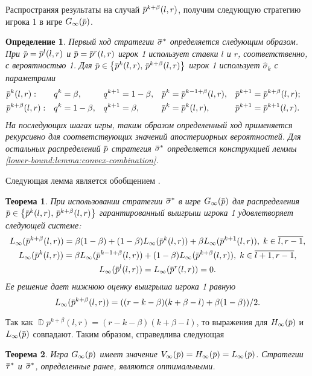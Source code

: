 \documentclass[12pt, draft]{extarticle}
\newtheorem{definition}{Определение}
\newtheorem{theorem}{Теорема}
\newcommand{\overbar}[1]%
{\mkern 1.5mu\overline{\mkern-1.3mu#1\mkern-1.3mu}\mkern 1.3mu}
\newcommand{\p}{\ensuremath{\overbar{p}}}
\DeclareMathOperator{\D}{\mathbb{D}}
\newcommand{\G}[1][n]{\ensuremath{G_{#1}}}
\newcommand{\V}[1][n]{\ensuremath{V_{#1}}}
\newcommand{\High}[1][\ensuremath{\infty}]{\ensuremath{H_{#1}}}
\newcommand{\sigmav}{\ensuremath{\overbar{\sigma}}}
\newcommand{\tauv}{\ensuremath{\overbar{\tau}}}
\newcommand{\sigmak}{\ensuremath{\hat{\sigma}}}
\newcommand{\Low}[1][\ensuremath{\infty}]{\ensuremath{L_{#1}}}
\begin{document}
Распространяя результаты \cite{bib:pyanykh16} на случай $\p^{k+\beta}(l, r)$,
получим следующую стратегию игрока 1 в игре $\G[\infty](\p)$. 

\begin{definition}
  Первый ход стратегии $\sigmav^*$ определяется следующим образом. При $\p =
  \p^l(l,r)$ и $\p = \p^r(l,r)$ игрок 1 использует ставки $l$ и $r$,
  соответственно, с вероятностью 1. Для %
  $\p \in \left\{ \p^k(l, r), \, \p^{k+\beta}(l, r) \right\}$ %
  игрок 1 использует $\sigmak_k$ с параметрами
  \begin{align*}
    &\p^k(l, r):&
    &q^k = \beta,&
    &q^{k+1} = 1-\beta,&
    &\p^k = \p^{k-1+\beta}(l, r),&
    &\p^{k+1} = \p^{k+\beta}(l, r);&\\
    &\p^{k+\beta}(l, r):&
    &q^k = 1-\beta,&
    &q^{k+1} = \beta,&
    &\p^k = \p^k(l, r),&
    &\p^{k+1} = \p^{k+1}(l, r).&
  \end{align*}
  На последующих шагах игры, таким образом определенный ход применяется
  рекурсивно для соответствующих значений апостериорных вероятностей. Для
  остальных распределений $\p$ стратегия $\sigmav^*$ определяется конструкцией
  леммы \ref{lower-bound:lemma:convex-combination}.
\end{definition}

Следующая лемма является обобщением \cite[Утверждение 5]{bib:pyanykh16}.
\begin{theorem}
  \label{lower-bound:theorem}
  При использовании стратегии $\sigmav^*$ в игре $\G[\infty](\p)$ для
  распределения %
  $\p \in \left\{ \p^k(l, r), \, \p^{k+\beta}(l, r) \right\}$ %
  гарантированный выигрыш игрока 1 удовлетворяет следующей системе:
  \begin{gather*}
    \Low(\p^{k+\beta}(l,r)) = 
    \beta(1-\beta) + (1-\beta) \Low(\p^k(l, r)) + \beta \Low(\p^{k+1}(l, r)), \;
    k \in \overline{l, r - 1}, \\
    \Low(\p^k(l,r)) = 
    \beta \Low(\p^{k-1+\beta}(l, r)) + (1-\beta) \Low(\p^{k+\beta}(l, r)), \;
    k \in \overline{l + 1, r - 1},\\
    \Low(\p^l(l,r)) = \Low(\p^r(l,r)) = 0.
  \end{gather*}
  Ее решение дает нижнюю оценку выигрыша игрока 1 равную
  \begin{equation*}
    \Low(\p^{k+\beta}(l, r)) = ((r-k-\beta)(k+\beta-l) + \beta(1-\beta))/2.
  \end{equation*}
\end{theorem}

Так как $\D p^{k+\beta}(l, r) = (r-k-\beta)(k+\beta-l)$, то выражения для
$\High(\p)$ и $\Low(\p)$ совпадают. Таким образом, справедлива следующая
\begin{theorem}
  \label{solution:theorem}
  Игра $\G[\infty](\p)$ имеет значение $\V[\infty](\p) = \High(\p) = \Low(\p)$.
  Стратегии $\tauv^*$ и $\sigmav^*$, определенные ранее, являются оптимальными.
\end{theorem}
\end{document}
